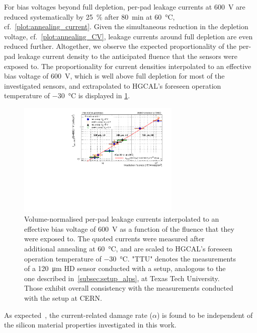 For bias voltages beyond full depletion, per-pad leakage currents at \SI{600}{\volt} are reduced systematically by \SI{25}{\percent} after \SI{80}{\minute} at \SI{60}{\celsius}, cf.~\ref{plot:annealing_current}.
Given the simultaneous reduction in the depletion voltage, cf.~\ref{plot:annealing_CV}, leakage currents around full depletion are even reduced further.
Altogether, we observe the expected proportionality of the per-pad leakage current density to the anticipated fluence that the sensors were exposed to.
The proportionality for current densities interpolated to an effective bias voltage of \SI{600}{\volt}, which is well above full depletion for most of the investigated sensors, and extrapolated to HGCAL's foreseen operation temperature of \SI{-30}{\celsius} is displayed in \ref{plot:alpha_600}.
\begin{figure}
	\captionsetup[subfigure]{aboveskip=-1pt,belowskip=-1pt}
	\centering
    \includegraphics[width=0.69\textwidth]{plots/alpha/alpha_600V.pdf}
	\caption{
		Volume-normalised per-pad leakage currents interpolated to an effective bias voltage of \SI{600}{\volt} as a function of the fluence that they were exposed to.
        The quoted currents were measured after additional annealing at \SI{60}{\celsius}, and are scaled to HGCAL's foreseen operation temperature of \SI{-30}{\celsius}.
		"TTU" denotes the measurements of a \SI{120}{\micro\meter} HD sensor conducted with a setup, analogous to the one described in~\ref{subsec:setup_alps}, at Texas Tech University. 
		Those exhibit overall consistency with the measurements conducted with the setup at CERN.
		}
	\label{plot:alpha_600}
\end{figure}
As expected~\cite{MOLL199987}, the current-related damage rate ($\alpha$) is found to be independent of the silicon material properties investigated in this work.
